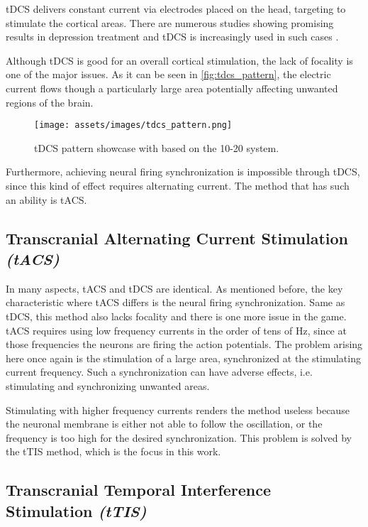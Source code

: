 \gls{tDCS} delivers constant current via electrodes placed on the head, targeting to stimulate the cortical areas. There are numerous studies showing promising results in depression treatment \cite{Moffa2020,Brunoni2016} and \gls{tDCS} is increasingly used in such cases \cite{Nitsche2008}.

Although \gls{tDCS} is good for an overall cortical stimulation, the lack of focality is one of the major issues. As it can be seen in \autoref{fig:tdcs_pattern}, the electric current flows though a particularly large area potentially affecting unwanted regions of the brain.

\begin{figure}[H]
    \centering
    \texttt{[image: assets/images/tdcs\_pattern.png]}
    \caption{\gls{tDCS} pattern showcase with  based on the 10-20 system.}
    \label{fig:tdcs_pattern}
\end{figure}

Furthermore, achieving neural firing synchronization is impossible through \gls{tDCS}, since this kind of effect requires alternating current. The method that has such an ability is \gls{tACS}.

\subsection{Transcranial Alternating Current Stimulation \textit{(tACS)}}

In many aspects, \gls{tACS} and \gls{tDCS} are identical. As mentioned before, the key characteristic where \gls{tACS} differs is the neural firing synchronization. Same as \gls{tDCS}, this method also lacks focality and there is one more issue in the game.
\gls{tACS} requires using low frequency currents in the order of tens of Hz, since at those frequencies the neurons are firing the action potentials. The problem arising here once again is the stimulation of a large area, synchronized at the stimulating current frequency. Such a synchronization can have adverse effects, i.e. stimulating and synchronizing unwanted areas.

Stimulating with higher frequency currents renders the method useless because the neuronal membrane is either not able to follow the oscillation, or the frequency is too high for the desired synchronization. This problem is solved by the \gls{tTIS} method, which is the focus in this work.

\subsection{Transcranial Temporal Interference Stimulation \textit{(tTIS)}}

